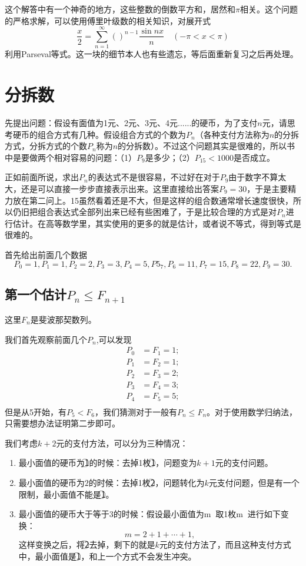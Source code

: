 \documentclass[cn]{elegantbook}
\begin{document}
这个解答中有一个神奇的地方，这些整数的倒数平方和，居然和$\pi$相关。这个问题的严格求解，可以使用傅里叶级数的相关知识，对展开式
\[
\frac{x}{2} = \sum_{n=1}^{\infty}{()^{n-1}\frac{\sin{nx}}{n}} \quad (-\pi < x < \pi)
\]
利用Parseval等式。这一块的细节本人也有些遗忘，等后面重新复习之后再处理。


\chapter{分拆数}
先提出问题：假设有面值为1元、2元、3元、4元......的硬币，为了支付$n$元，请思考硬币的组合方式有几种。假设组合方式的个数为$P_n$（各种支付方法称为$n$的分拆方式，分拆方式的个数$P_n$称为$n$的分拆数）。不过这个问题其实是很难的，所以书中是要做两个相对容易的问题：（1）$P_9$是多少；（2）$P_{15}<1000$是否成立。

正如前面所说，求出$P_n$的表达式不是很容易，不过好在对于$P_9$由于数字不算太大，还是可以直接一步步直接表示出来。这里直接给出答案$P_9=30$，于是主要精力放在第二问上。15虽然看着还是不大，但是这样的组合数通常增长速度很快，所以仍旧把组合表达式全部列出来已经有些困难了，于是比较合理的方式是对$P_n$进行估计。在高等数学里，其实使用的更多的就是估计，或者说不等式，得到等式是很难的。

首先给出前面几个数据
\[
P_0=1,P_1=1,P_2=2,P_3=3,P_4=5,P5_7,P_6=11,P_7=15,P_8=22,P_9=30.
\]

\section{第一个估计$P_n \le F_{n+1}$}
这里$F_n$是斐波那契数列。

我们首先观察前面几个$P_n$,可以发现
\[
\begin{aligned}
P_0 &= F_1 = 1;\\
P_1 &= F_2 = 1; \\
P_2 &= F_3 = 2; \\
P_3 &= F_4 = 3; \\
P_4 &= F_5 = 5; \\
\end{aligned}
\]
但是从5开始，有$P_5 < F_6$，我们猜测对于一般有$P_n \le F_n$。对于使用数学归纳法，只需要想办法证明第二步即可。

我们考虑$k+2$元的支付方法，可以分为三种情况：

\begin{enumerate}
\item 最小面值的硬币为\textcircled{1}的时候：去掉1枚\textcircled{1}，问题变为$k+1$元的支付问题。
\item 最小面值的硬币为$2$的时候：去掉1枚\textcircled{2}，问题转化为$k$元支付问题，但是有一个限制，最小面值不能是\textcircled{1}。
\item 最小面值的硬币大于等于$3$的时候：假设最小面值为\textcircled{m}，取1枚\textcircled{m}，进行如下变换：
\[
m = 2 + 1 + \cdots + 1,
\]
这样变换之后，将\textcircled{2}去掉，剩下的就是$k$元的支付方法了，而且这种支付方式中，最小面值是\textcircled{1}，和上一个方式不会发生冲突。
\end{enumerate}
\end{document}
